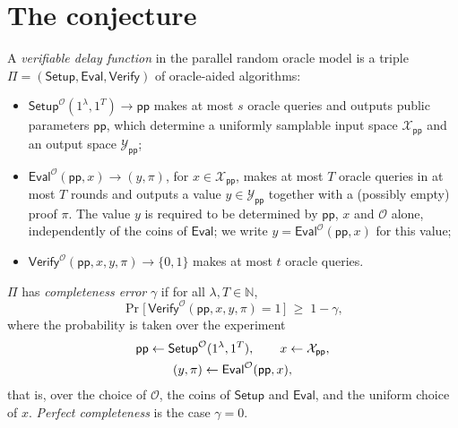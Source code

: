 \documentclass{aicr-conjecture}
\newcommand{\RO}{\mathcal{O}}
\newcommand{\Setup}{\mathsf{Setup}}
\newcommand{\Eval}{\mathsf{Eval}}
\newcommand{\Verify}{\mathsf{Verify}}
\newcommand{\pp}{\mathsf{pp}}
\newcommand{\Xpp}{\mathcal{X}_{\pp}}
\newcommand{\Ypp}{\mathcal{Y}_{\pp}}
\begin{document}
\section{The conjecture}\label{sec:conjectures}

\begin{definition}\label{def:vdf}
A \emph{verifiable delay function} in the parallel random oracle model is a
triple $\Pi = (\Setup, \Eval, \Verify)$ of oracle-aided algorithms:
\begin{itemize}
  \item $\Setup^{\RO}(1^{\lambda}, 1^{T}) \to \pp$ makes at most $s$ oracle
    queries and outputs public parameters $\pp$, which determine a
    uniformly samplable input space $\Xpp$ and an output space $\Ypp$;
  \item $\Eval^{\RO}(\pp, x) \to (y, \pi)$, for $x \in \Xpp$, makes at most
    $T$ oracle queries in at most $T$ rounds and outputs a value
    $y \in \Ypp$ together with a (possibly empty) proof $\pi$. The value
    $y$ is required to be determined by $\pp$, $x$ and $\RO$ alone,
    independently of the coins of $\Eval$; we write
    $y = \Eval^{\RO}(\pp, x)$ for this value;
  \item $\Verify^{\RO}(\pp, x, y, \pi) \to \{0,1\}$ makes at most $t$
    oracle queries.
\end{itemize}
$\Pi$ has \emph{completeness error} $\gamma$ if for all
$\lambda, T \in \mathbb{N}$,
\[
  \Pr\bigl[\, \Verify^{\RO}(\pp, x, y, \pi) = 1 \,\bigr] \;\ge\; 1 - \gamma,
\]
where the probability is taken over the experiment
\begin{gather*}
  \pp \sample \Setup^{\RO}(1^{\lambda}, 1^{T}), \qquad
  x \sample \Xpp, \\
  (y, \pi) \sample \Eval^{\RO}(\pp, x),
\end{gather*}
that is, over the choice of $\RO$, the coins of $\Setup$ and $\Eval$, and
the uniform choice of $x$. \emph{Perfect completeness} is the case
$\gamma = 0$.
\end{definition}
\end{document}
